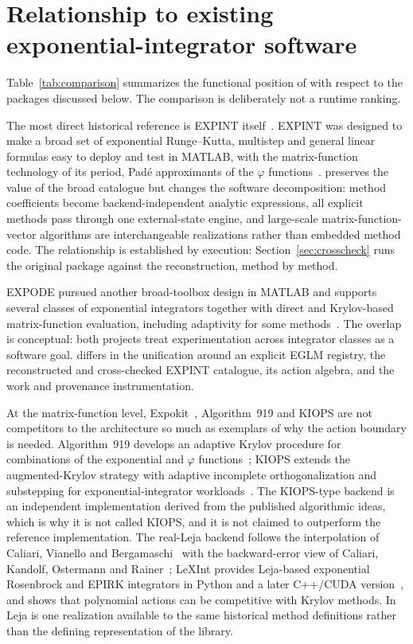 \section{Relationship to existing exponential-integrator software}\label{sec:related}

Table~\ref{tab:comparison} summarizes the functional position of \pkg{} with
respect to the packages discussed below.  The comparison is deliberately not a
runtime ranking.


The most direct historical reference is EXPINT
itself~\cite{BerlandSkaflestadWright2007}.  EXPINT was designed to make a broad
set of exponential Runge--Kutta, multistep and general linear formulas easy to
deploy and test in MATLAB, with the matrix-function technology of its period,
Pad\'e approximants of the $\varphi$ functions~\cite{SkaflestadWright2009}.
\pkg{} preserves the value of the broad catalogue but changes the software
decomposition: method coefficients become backend-independent analytic
expressions, all explicit methods pass through one external-state engine, and
large-scale matrix-function-vector algorithms are interchangeable realizations
rather than embedded method code.  The relationship is established by
execution: Section~\ref{sec:crosscheck} runs the original package against the
reconstruction, method by method.

EXPODE pursued another broad-toolbox design in MATLAB and supports several
classes of exponential integrators together with direct and Krylov-based
matrix-function evaluation, including adaptivity for some
methods~\cite{Jansing2014}.  The overlap is conceptual: both projects treat
experimentation across integrator classes as a software goal.  \pkg{} differs
in the unification around an explicit EGLM registry, the reconstructed and
cross-checked EXPINT catalogue, its action algebra, and the work and provenance
instrumentation.

At the matrix-function level, Expokit~\cite{Sidje1998}, Algorithm~919 and
KIOPS are not competitors to the \pkg{} architecture so much as exemplars of
why the action boundary is needed.  Algorithm~919 develops an adaptive Krylov
procedure for combinations of the exponential and $\varphi$
functions~\cite{NiesenWright2012}; KIOPS extends the augmented-Krylov strategy
with adaptive incomplete orthogonalization and substepping for
exponential-integrator workloads~\cite{GaudreaultRainwaterTokman2018}.  The
\pkg{} KIOPS-type backend is an independent implementation derived from the
published algorithmic ideas, which is why it is not called KIOPS, and it is not
claimed to outperform the reference implementation.  The real-Leja backend
follows the interpolation of Caliari, Vianello and
Bergamaschi~\cite{CaliariVianelloBergamaschi2004} with the backward-error view
of Caliari, Kandolf, Ostermann and Rainer~\cite{CaliariKandolfOstermannRainer2016};
LeXInt provides Leja-based exponential Rosenbrock and EPIRK integrators in
Python and a later C++/CUDA
version~\cite{DekaEinkemmerTokman2023,DekaMorigglEinkemmer2023}, and shows that
polynomial actions can be competitive with Krylov methods.  In \pkg{} Leja is
one realization available to the same historical method definitions rather
than the defining representation of the library.

